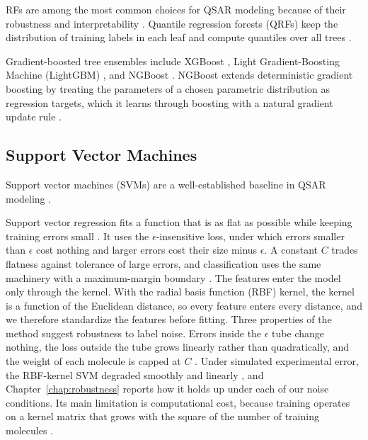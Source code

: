 RFs are among the most common choices for QSAR modeling because of their robustness and interpretability \citep{Svetnik2003}. Quantile regression forests (QRFs) keep the distribution of training labels in each leaf and compute quantiles over all trees \citep{Meinshausen2006}.

Gradient-boosted tree ensembles include XGBoost \citep{Mustapha2016, Tian2022}, Light Gradient-Boosting Machine (LightGBM) \citep{ke2017lightgbm}, and NGBoost \citep{Duan2020}. NGBoost extends deterministic gradient boosting by treating the parameters of a chosen parametric distribution as regression targets, which it learns through boosting with a natural gradient update rule \citep{Duan2020}.


\subsection{Support Vector Machines}

Support vector machines (SVMs) are a well-established baseline in QSAR modeling \citep{Vapnik1995, Svetnik2003}.

Support vector regression fits a function that is as flat as possible while keeping training errors small \citep{Vapnik1995, Smola2004}. It uses the $\epsilon$-insensitive loss, under which errors smaller than $\epsilon$ cost nothing and larger errors cost their size minus $\epsilon$. A constant $C$ trades flatness against tolerance of large errors, and classification uses the same machinery with a maximum-margin boundary \citep{Cortes1995}. The features enter the model only through the kernel. With the radial basis function (RBF) kernel, the kernel is a function of the Euclidean distance, so every feature enters every distance, and we therefore standardize the features before fitting. Three properties of the method suggest robustness to label noise. Errors inside the $\epsilon$ tube change nothing, the loss outside the tube grows linearly rather than quadratically, and the weight of each molecule is capped at $C$ \citep{Smola2004}. Under simulated experimental error, the RBF-kernel SVM degraded smoothly and linearly \citep{Cortes2015}, and Chapter~\ref{chap:robustness} reports how it holds up under each of our noise conditions. Its main limitation is computational cost, because training operates on a kernel matrix that grows with the square of the number of training molecules \citep{Chang2011}.


